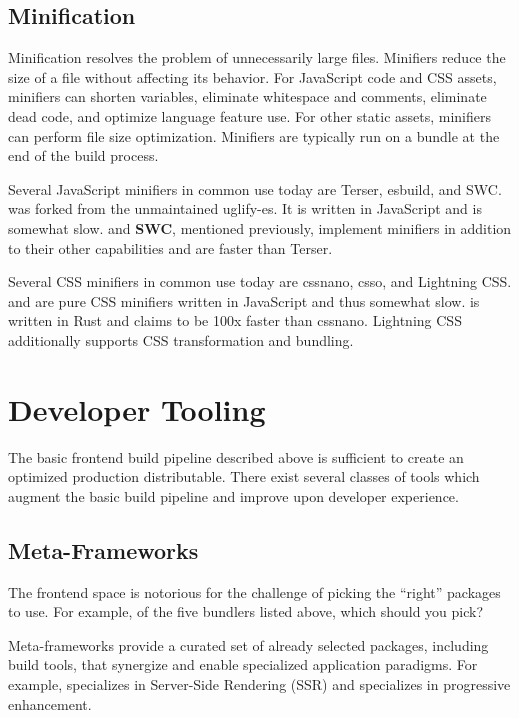 \documentclass{article}
\begin{document}
\subsection{Minification}

Minification resolves the problem of unnecessarily large files. Minifiers reduce the size of a file
without affecting its behavior. For JavaScript code and CSS assets, minifiers can shorten variables,
eliminate whitespace and comments, eliminate dead code, and optimize language feature use. For other
static assets, minifiers can perform file size optimization. Minifiers are typically run on a bundle
at the end of the build process.

Several JavaScript minifiers in common use today are Terser, esbuild, and SWC.
\href{https://terser.org/}{} was forked from the unmaintained uglify-es. It is written in
JavaScript and is somewhat slow.  and \textbf{SWC}, mentioned previously, implement
minifiers in addition to their other capabilities and are faster than Terser.

Several CSS minifiers in common use today are cssnano, csso, and Lightning CSS.
\href{https://cssnano.github.io/cssnano/}{} and
\href{https://github.com/css/csso}{} are pure CSS minifiers written in JavaScript and thus
somewhat slow. \href{https://lightningcss.dev/}{} is written in Rust and claims to
be 100x faster than cssnano. Lightning CSS additionally supports CSS transformation and bundling.

\section{Developer Tooling}

The basic frontend build pipeline described above is sufficient to create an optimized production
distributable. There exist several classes of tools which augment the basic build pipeline and
improve upon developer experience.

\subsection{Meta-Frameworks}

The frontend space is notorious for the challenge of picking the ``right'' packages to use. For
example, of the five bundlers listed above, which should you pick?

Meta-frameworks provide a curated set of already selected packages, including build tools, that
synergize and enable specialized application paradigms. For example,
\href{https://nextjs.org}{} specializes in Server-Side Rendering (SSR) and
\href{https://remix.run}{} specializes in progressive enhancement.
\end{document}
